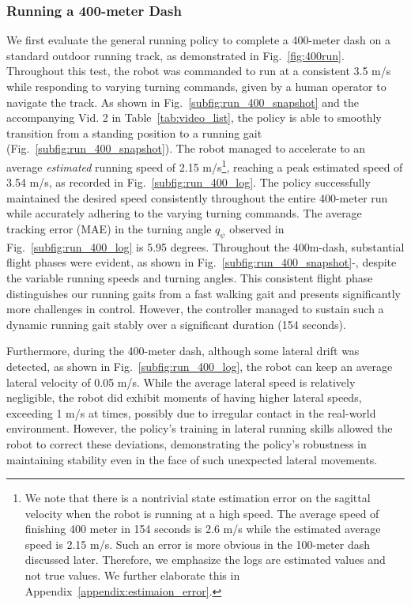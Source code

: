\subsubsection{Running a 400-meter Dash}
We first evaluate the general running policy to complete a 400-meter dash on a standard outdoor running track, as demonstrated in Fig.~\ref{fig:400run}.
Throughout this test, the robot was commanded to run at a consistent 3.5 m/s while responding to varying turning commands, given by a human operator to navigate the track. 
As shown in Fig.~\ref{subfig:run_400_snapshot} and the accompanying Vid. 2 in Table~\ref{tab:video_list}, the policy is able to smoothly transition from a standing position to a running gait (Fig.~\ref{subfig:run_400_snapshot}). 
The robot managed to accelerate to an average \emph{estimated} running speed of 2.15 m/s\footnote{We note that there is a nontrivial state estimation error on the sagittal velocity when the robot is running at a high speed. The average speed of finishing 400 meter in 154 seconds is 2.6 m/s while the estimated average speed is 2.15 m/s. Such an error is more obvious in the 100-meter dash discussed later. Therefore, we emphasize the logs are estimated values and not true values. We further elaborate this in Appendix~\ref{appendix:estimaion_error}.}, reaching a peak estimated speed of 3.54 m/s, as recorded in Fig.~\ref{subfig:run_400_log}.
The policy successfully maintained the desired speed consistently throughout the entire 400-meter run while accurately adhering to the varying turning commands. 
The average tracking error (MAE) in the turning angle $q_{\psi}$ observed in Fig.~\ref{subfig:run_400_log} is 5.95 degrees.
Throughout the 400m-dash, substantial flight phases were evident, as shown in Fig.~\ref{subfig:run_400_snapshot}-, despite the variable running speeds and turning angles. 
This consistent flight phase distinguishes our running gaits from a fast walking gait and presents significantly more challenges in control. 
However, the controller managed to sustain such a dynamic running gait stably over a significant duration (154 seconds).

Furthermore, during the 400-meter dash, although some lateral drift was detected, as shown in Fig.~\ref{subfig:run_400_log}, the robot can keep an average lateral velocity of 0.05 m/s. 
While the average lateral speed is relatively negligible, the robot did exhibit moments of having higher lateral speeds, exceeding 1 m/s at times, possibly due to irregular contact in the real-world environment. 
However, the policy's training in lateral running skills allowed the robot to correct these deviations, demonstrating the policy's robustness in maintaining stability even in the face of such unexpected lateral movements.

